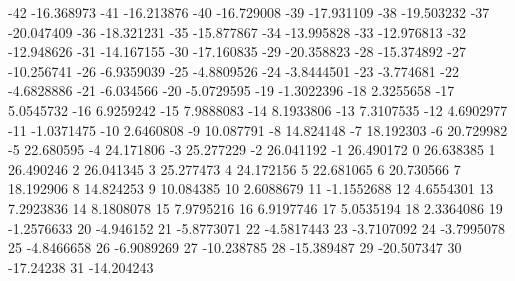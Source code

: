 -42                      -16.368973
-41                      -16.213876
-40                      -16.729008
-39                      -17.931109
-38                      -19.503232
-37                      -20.047409
-36                      -18.321231
-35                      -15.877867
-34                      -13.995828
-33                      -12.976813
-32                      -12.948626
-31                      -14.167155
-30                      -17.160835
-29                      -20.358823
-28                      -15.374892
-27                      -10.256741
-26                      -6.9359039
-25                      -4.8809526
-24                      -3.8444501
-23                       -3.774681
-22                      -4.6828886
-21                       -6.034566
-20                      -5.0729595
-19                      -1.3022396
-18                       2.3255658
-17                       5.0545732
-16                       6.9259242
-15                       7.9888083
-14                       8.1933806
-13                       7.3107535
-12                       4.6902977
-11                      -1.0371475
-10                       2.6460808
-9                       10.087791
-8                       14.824148
-7                       18.192303
-6                       20.729982
-5                       22.680595
-4                       24.171806
-3                       25.277229
-2                       26.041192
-1                       26.490172
0                       26.638385
1                       26.490246
2                       26.041345
3                       25.277473
4                       24.172156
5                       22.681065
6                       20.730566
7                       18.192906
8                       14.824253
9                       10.084385
10                       2.6088679
11                      -1.1552688
12                       4.6554301
13                       7.2923836
14                       8.1808078
15                       7.9795216
16                       6.9197746
17                       5.0535194
18                       2.3364086
19                      -1.2576633
20                       -4.946152
21                      -5.8773071
22                      -4.5817443
23                      -3.7107092
24                      -3.7995078
25                      -4.8466658
26                      -6.9089269
27                      -10.238785
28                      -15.389487
29                      -20.507347
30                       -17.24238
31                      -14.204243
